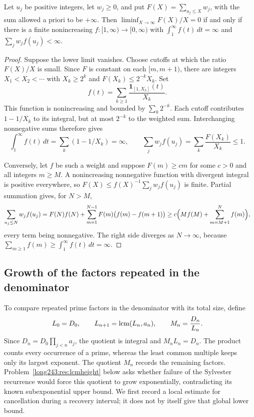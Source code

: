 \documentclass[11pt]{article}
\begin{document}
\begin{lemma}\label{res:weights}
Let $u_j$ be positive integers, let $w_j\ge0$, and put
$F(X)=\sum_{u_j\le X}w_j$, with the sum allowed a priori to be $+\infty$. Then $\liminf_{X\to\infty}F(X)/X=0$ if and only if
there is a finite nonincreasing $f:[1,\infty)\to[0,\infty)$ with
$\int_1^\infty f(t)\,dt=\infty$ and $\sum_jw_jf(u_j)<\infty$.
\end{lemma}

\begin{proof}
Suppose the lower limit vanishes. Choose cutoffs at which the ratio
$F(X)/X$ is small. Since $F$ is constant on each $[m,m+1)$, there are
integers $X_1<X_2<\cdots$ with $X_k\ge2^k$ and
$F(X_k)\le2^{-k}X_k$. Set
\[
 f(t)=\sum_{k\ge1}\frac{\mathbf 1_{[1,X_k]}(t)}{X_k}.
\]
This function is nonincreasing and bounded by $\sum_k2^{-k}$.
Each cutoff contributes $1-1/X_k$ to its integral, but at most $2^{-k}$
to the weighted sum. Interchanging nonnegative sums therefore gives
\[
 \int_1^\infty f(t)\,dt=\sum_k(1-1/X_k)=\infty,
 \qquad
 \sum_jw_jf(u_j)=\sum_k\frac{F(X_k)}{X_k}\le1.
\]

Conversely, let $f$ be such a weight and suppose $F(m)\ge cm$ for some $c>0$
and all integers $m\ge M$. A nonincreasing nonnegative function with divergent
integral is positive everywhere, so $F(X)\le f(X)^{-1}\sum_jw_jf(u_j)$ is
finite. Partial summation gives, for $N>M$,
\[
 \sum_{u_j\le N}w_jf(u_j)
 =F(N)f(N)+\sum_{m=1}^{N-1}F(m)\bigl(f(m)-f(m+1)\bigr)
 \ge c\Bigl(Mf(M)+\sum_{m=M+1}^{N}f(m)\Bigr),
\]
every term being nonnegative. The right side diverges as $N\to\infty$, because
$\sum_{m\ge1}f(m)\ge\int_1^\infty f(t)\,dt=\infty$.
\end{proof}

\subsection{Growth of the factors repeated in the denominator}

To compare repeated prime factors in the denominator with its total
size, define
\[
 L_0=D_0,\qquad L_{n+1}=\operatorname{lcm}(L_n,a_n),\qquad M_n=\frac{D_n}{L_n}.
\]
Since $D_n=D_0\prod_{j<n}a_j$, the quotient is integral and
$M_nL_n=D_n$.  The product counts every occurrence of a prime, whereas the least
common multiple keeps only its largest exponent. The quotient $M_n$
records the remaining factors. Problem~\ref{long243:res:lcmheight}
below asks whether failure of the Sylvester recurrence would force this
quotient to grow exponentially, contradicting its known subexponential
upper bound. We first record a local estimate for cancellation during
a recovery interval; it does not by itself give that global lower bound.
\end{document}
